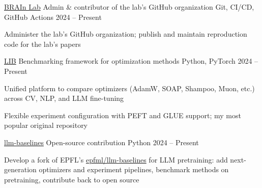 
\begin{cventries}

  \cventry
    {\href{https://github.com/brain-lab-research}{BRAIn Lab}} %
    {Admin \& contributor of the lab's GitHub organization} %
    {Git, CI/CD, GitHub Actions} %
    {2024 -- Present} %
    {
      \begin{cvitems}
        \item {Administer the lab's GitHub organization; publish and maintain reproduction code for the lab's papers}
      \end{cvitems}
    }

  \cventry
    {\href{https://github.com/Vepricov/LIB}{LIB}} %
    {Benchmarking framework for optimization methods} %
    {Python, PyTorch} %
    {2024 -- Present} %
    {
      \begin{cvitems}
        \item {Unified platform to compare optimizers (AdamW, SOAP, Shampoo, Muon, etc.) across CV, NLP, and LLM fine-tuning}
        \item {Flexible experiment configuration with PEFT and GLUE support; my most popular original repository}
      \end{cvitems}
    }

  \cventry
    {\href{https://github.com/Vepricov/llm-baselines}{llm-baselines}} %
    {Open-source contribution} %
    {Python} %
    {2024 -- Present} %
    {
      \begin{cvitems}
        \item {Develop a fork of EPFL's \href{https://github.com/epfml/llm-baselines}{epfml/llm-baselines} for LLM pretraining: add next-generation optimizers and experiment pipelines, benchmark methods on pretraining, contribute back to open source}
      \end{cvitems}
    }


\end{cventries}
